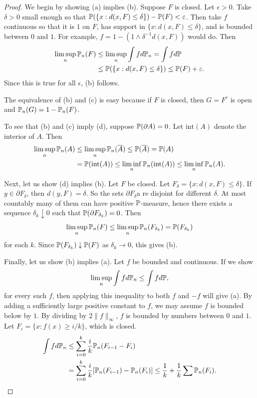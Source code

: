 \begin{proof}
We begin by showing (a) implies (b). Suppose $F$ is closed. Let $\epsilon > 0$. Take $\delta > 0$ small enough so that $\P(\{x : d(x,F) \leq \delta\}) - \P(F) < \epsilon$. Then take $f$ continuous so that it is $1$ on $F$, has support in $\{x : d(x,F) \leq \delta\}$, and is bounded between $0$ and $1$. For example, $f = 1 - (1 \wedge \delta^{-1}d(x,F))$ would do. Then
\begin{align*}
    \limsup_n \P_n(F) &\leq \limsup_n \int f d\P_n = \int f d\P \\
    &\leq \P(\{x : d(x,F) \leq \delta\}) \leq \P(F) + \epsilon.
\end{align*}
Since this is true for all $\epsilon$, (b) follows.

The equivalence of (b) and (c) is easy because if $F$ is closed, then $G = F^c$ is open and $\P_n(G) = 1 - \P_n(F)$.

To see that (b) and (c) imply (d), suppose $\P(\partial A) = 0$. Let $\text{int}(A)$ denote the interior of $A$. Then
\begin{align*}
    \limsup_n \P_n(A) &\leq \limsup_n \P_n(\overline{A}) \leq \P(\overline{A}) = \P(A) \\
    &= \P(\text{int}(A)) \leq \liminf_n \P_n(\text{int}(A)) \leq \liminf_n \P_n(A).
\end{align*}

Next, let us show (d) implies (b). Let $F$ be closed. Let $F_\delta = \{x : d(x,F) \leq \delta\}$. If $y \in \partial F_\delta$, then $d(y,F) = \delta$. So the sets $\partial F_\delta$a re disjoint for different $\delta$. At most countably many of them can have positive $\P$-measure, hence there exists a sequence $\delta_k \downarrow 0$ such that $\P(\partial F_{\delta_k}) = 0$. Then
\[
    \limsup_n \P_n(F) \leq \limsup_n \P_n(F_{\delta_k}) = \P(F_{\delta_k})
\]
for each $k$. Since $\P(F_{\delta_k}) \downarrow \P(F)$ as $\delta_k \to 0$, this gives (b).

Finally, let us show (b) implies (a). Let $f$ be bounded and continuous. If we show
\begin{equation}\label{eq:ch1_7.1}
    \limsup_n \int f d\P_n \leq \int f d\P,
\end{equation}
for every such $f$, then applying this inequality to both $f$ and $-f$ will give (a). By adding a sufficiently large positive constant to $f$, we may assume $f$ is bounded below by $1$. By dividing by $2\|f\|_\infty$, $f$ is bounded by numbers between $0$ and $1$. Let $F_i = \{x : f(x) \geq i/k\}$, which is closed.
\begin{align*}
    \int f d\P_n &\leq \sum_{i=0}^k \frac{i}{k}\P_n(F_{i-1} - F_i) \\
    &= \sum_{i=0}^k \frac{i}{k}[\P_n(F_{i-1})-\P_n(F_i)] \leq \frac{1}{k} + \frac{1}{k}\sum \P_n(F_i).
\end{align*}


\end{proof}
